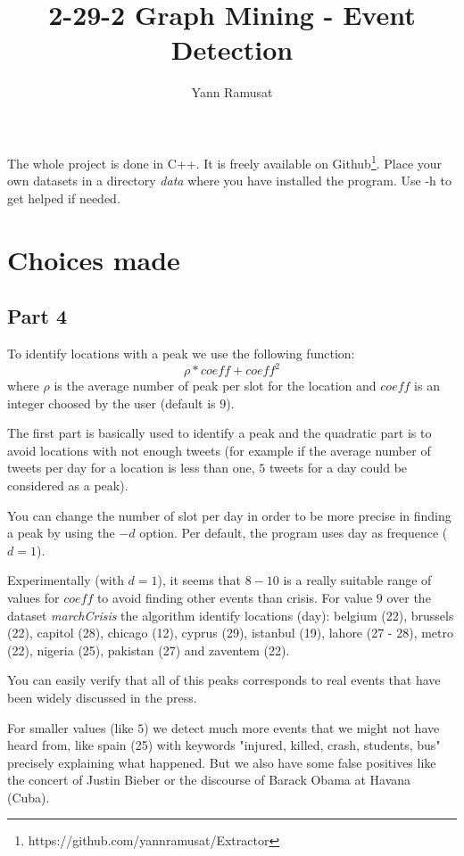 \documentclass[a4paper]{article}
\title{2-29-2 Graph Mining - Event Detection}
\author{Yann Ramusat}
\begin{document}
\maketitle
The whole project is done in C++. It is freely available on Github\footnote{https://github.com/yannramusat/Extractor}. Place your own datasets in a directory \textit{data} where you have installed the program. Use -h to get helped if needed. 

\section{Choices made}
\subsection{Part 4}

 To identify locations with a peak we use the following function:
\[
   \rho*coeff + coeff^2
\]
 where $\rho$ is the average number of peak per slot for the location and $coeff$ is an integer choosed by the user (default is $9$). 
 
 The first part is basically used to identify a peak and the quadratic part is to avoid locations with not enough tweets (for example if the average number of tweets per day for a location is less than one, $5$ tweets for a day could be considered as a peak).
 
 You can change the number of slot per day in order to be more precise in finding a peak by using the $-d$ option. Per default, the program uses day as frequence ($d=1$). 
 
 Experimentally (with $d=1$), it seems that $8-10$ is a really suitable range of values for $coeff$ to avoid finding other events than crisis. For value $9$ over the dataset \textit{marchCrisis} the algorithm identify locations (day): belgium (22), brussels (22), capitol (28), chicago (12), cyprus (29), istanbul (19), lahore (27 - 28), metro (22), nigeria (25), pakistan (27) and zaventem (22).
 
 You can easily verify that all of this peaks corresponds to real events that have been widely discussed in the press.
 
 For smaller values (like $5$) we detect much more events that we might not have heard from, like spain (25) with keywords "injured, killed, crash, students, bus" precisely explaining what happened. But we also have some false positives like the concert of Justin Bieber or the discourse of Barack Obama at Havana (Cuba).
 
\end{document}
